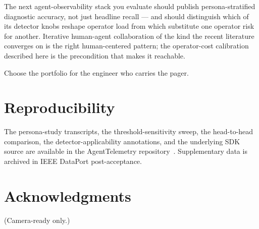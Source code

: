 \documentclass[journal]{IEEEtran}
\begin{document}
The next agent-observability stack you evaluate should publish persona-stratified diagnostic accuracy, not just headline recall --- and should distinguish which of its detector knobs reshape operator load from which substitute one operator risk for another. Iterative human-agent collaboration of the kind the recent literature \cite{murphyhill2025,abrahao2025} converges on is the right human-centered pattern; the operator-cost calibration described here is the precondition that makes it reachable.

Choose the portfolio for the engineer who carries the pager.

\section*{Reproducibility}

The persona-study transcripts, the threshold-sensitivity sweep, the head-to-head comparison, the detector-applicability annotations, and the underlying SDK source are available in the AgentTelemetry repository~\cite{atrepo}. Supplementary data is archived in IEEE DataPort post-acceptance.

\section*{Acknowledgments}
\noindent (Camera-ready only.)
\end{document}
